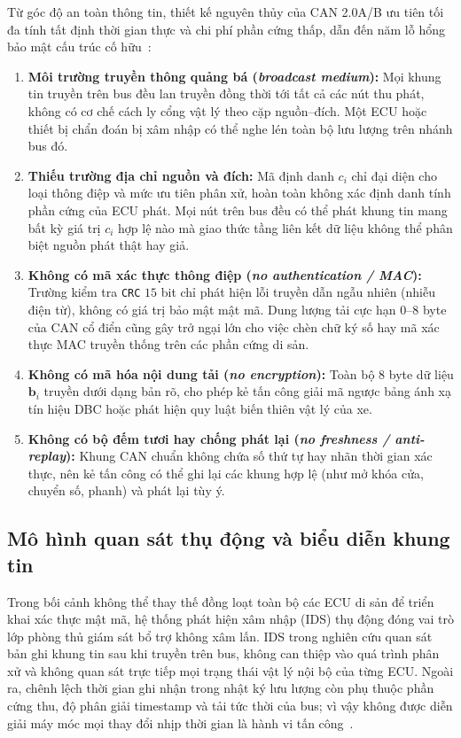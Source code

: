 \documentclass[12pt, a4paper, reqno, oneside]{book}
\DeclareRobustCommand{\code}[1]{\nolinkurl{#1}}
\begin{document}
Từ góc độ an toàn thông tin, thiết kế nguyên thủy của CAN 2.0A/B ưu tiên tối đa tính tất định thời gian thực và chi phí phần cứng thấp, dẫn đến năm lỗ hổng bảo mật cấu trúc cố hữu~\cite{bozdal2020evaluation,koscher2010experimental,checkoway2011comprehensive}:
\begin{enumerate}
    \item \textbf{Môi trường truyền thông quảng bá (\textit{broadcast medium}):} Mọi khung tin truyền trên bus đều lan truyền đồng thời tới tất cả các nút thu phát, không có cơ chế cách ly cổng vật lý theo cặp nguồn--đích. Một ECU hoặc thiết bị chẩn đoán bị xâm nhập có thể nghe lén toàn bộ lưu lượng trên nhánh bus đó.
    \item \textbf{Thiếu trường địa chỉ nguồn và đích:} Mã định danh $c_i$ chỉ đại diện cho loại thông điệp và mức ưu tiên phân xử, hoàn toàn không xác định danh tính phần cứng của ECU phát. Mọi nút trên bus đều có thể phát khung tin mang bất kỳ giá trị $c_i$ hợp lệ nào mà giao thức tầng liên kết dữ liệu không thể phân biệt nguồn phát thật hay giả.
    \item \textbf{Không có mã xác thực thông điệp (\textit{no authentication / MAC}):} Trường kiểm tra \code{CRC} $15$ bit chỉ phát hiện lỗi truyền dẫn ngẫu nhiên (nhiễu điện từ), không có giá trị bảo mật mật mã. Dung lượng tải cực hạn $0\text{--}8$ byte của CAN cổ điển cũng gây trở ngại lớn cho việc chèn chữ ký số hay mã xác thực MAC truyền thống trên các phần cứng di sản.
    \item \textbf{Không có mã hóa nội dung tải (\textit{no encryption}):} Toàn bộ $8$ byte dữ liệu $\mathbf{b}_i$ truyền dưới dạng bản rõ, cho phép kẻ tấn công giải mã ngược bảng ánh xạ tín hiệu DBC hoặc phát hiện quy luật biến thiên vật lý của xe.
    \item \textbf{Không có bộ đếm tươi hay chống phát lại (\textit{no freshness / anti-replay}):} Khung CAN chuẩn không chứa số thứ tự hay nhãn thời gian xác thực, nên kẻ tấn công có thể ghi lại các khung hợp lệ (như mở khóa cửa, chuyển số, phanh) và phát lại tùy ý.
\end{enumerate}

\subsection{Mô hình quan sát thụ động và biểu diễn khung tin}
Trong bối cảnh không thể thay thế đồng loạt toàn bộ các ECU di sản để triển khai xác thực mật mã, hệ thống phát hiện xâm nhập (IDS) thụ động đóng vai trò lớp phòng thủ giám sát bổ trợ không xâm lấn. IDS trong nghiên cứu quan sát bản ghi khung tin sau khi truyền trên bus, không can thiệp vào quá trình phân xử và không quan sát trực tiếp mọi trạng thái vật lý nội bộ của từng ECU. Ngoài ra, chênh lệch thời gian ghi nhận trong nhật ký lưu lượng còn phụ thuộc phần cứng thu, độ phân giải timestamp và tải tức thời của bus; vì vậy không được diễn giải máy móc mọi thay đổi nhịp thời gian là hành vi tấn công~\cite{bozdal2020evaluation,verma2024road}.
\end{document}
